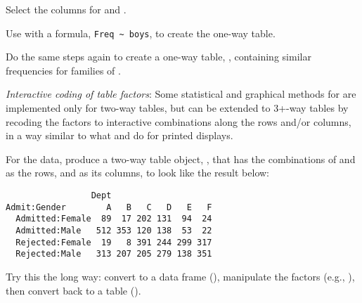 \documentclass[11pt]{report}\usepackage[]{graphicx}\usepackage[]{color}
\begin{document}
\begin{Exercises}
\begin{enumerate*}
    \item Select the columns for  and .
    \begin{ans}
    \end{ans}
    
    \item Use  with a formula, \verb|Freq ~ boys|, to create the
    one-way table.
    \begin{ans}
    \end{ans}
    
    \item Do the same steps again to create a one-way table, ,
    containing similar frequencies for families of .
    \begin{ans}
    \end{ans}
    
  \end{enumerate*}

\exercise\exhard \emph{Interactive coding of table factors}:  Some statistical and graphical
methods for \ctabs are implemented only for two-way tables, but can be extended
to 3+-way tables by recoding the factors to interactive combinations along the
rows and/or columns, in a way similar to what  and 
do for printed displays.

For the  data, produce a two-way table object, ,
that has the combinations of  and  as the rows, and
 as its columns, to look like the result below:
\begin{verbatim}
                 Dept
Admit:Gender        A   B   C   D   E   F
  Admitted:Female  89  17 202 131  94  24
  Admitted:Male   512 353 120 138  53  22
  Rejected:Female  19   8 391 244 299 317
  Rejected:Male   313 207 205 279 138 351
\end{verbatim}
  \begin{enumerate*}
    \item Try this the long way:  convert  to a data frame (),
    manipulate the factors (e.g., ), then convert back to
a table ().
    \begin{ans}
    \end{ans}
    

\end{enumerate*}
\end{Exercises}
\end{document}
